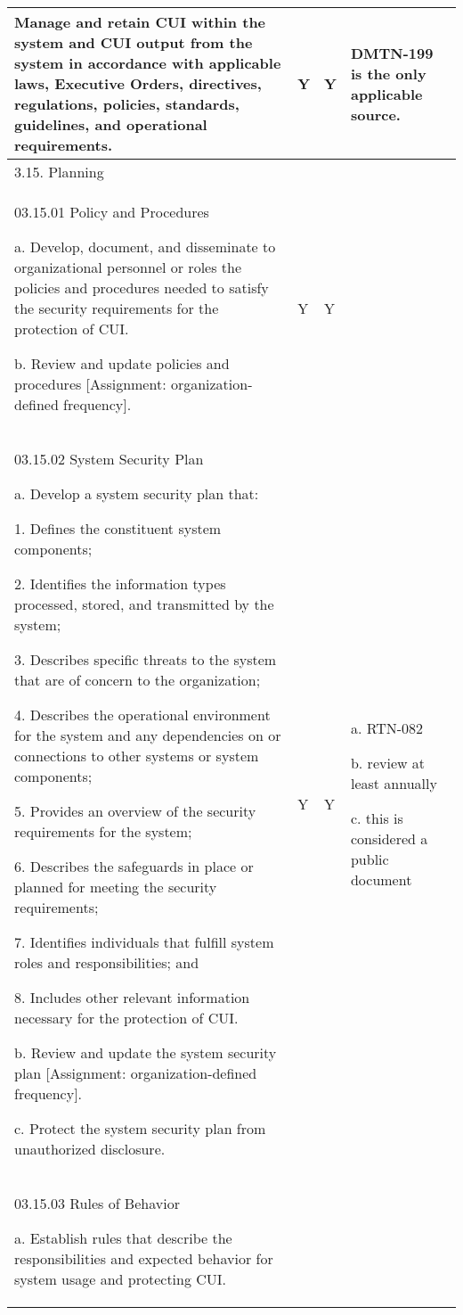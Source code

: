 \begin{longtable} {|p{}|p{}|p{}|p{} |}
{Manage and retain CUI within the system and CUI output from the system in accordance with applicable laws, Executive Orders, directives, regulations, policies, standards, guidelines, and operational requirements.}&{Y}&{Y}&{DMTN-199 is the only applicable source.} \\ \hline
{3.15. Planning}&&& \\ \hline
{03.15.01 Policy and Procedures

a. Develop, document, and disseminate to organizational personnel or roles the policies and procedures needed to satisfy the security requirements for the protection of CUI.

b. Review and update policies and procedures [Assignment: organization-defined frequency].}&{Y}&{Y}& \\ \hline
{03.15.02 System Security Plan

a. Develop a system security plan that:

1. Defines the constituent system components;

2. Identifies the information types processed, stored, and transmitted by the system;

3. Describes specific threats to the system that are of concern to the organization;

4. Describes the operational environment for the system and any dependencies on or connections to other systems or system components;

5. Provides an overview of the security requirements for the system;

6. Describes the safeguards in place or planned for meeting the security requirements;

7. Identifies individuals that fulfill system roles and responsibilities; and

8. Includes other relevant information necessary for the protection of CUI.

b. Review and update the system security plan [Assignment: organization-defined frequency].

c. Protect the system security plan from unauthorized disclosure.}&{Y}&{Y}&{a. RTN-082

b. review at least annually

c. this is considered a public document} \\ \hline
{03.15.03 Rules of Behavior

a. Establish rules that describe the responsibilities and expected behavior for system usage and protecting CUI.

}
\end{longtable}
